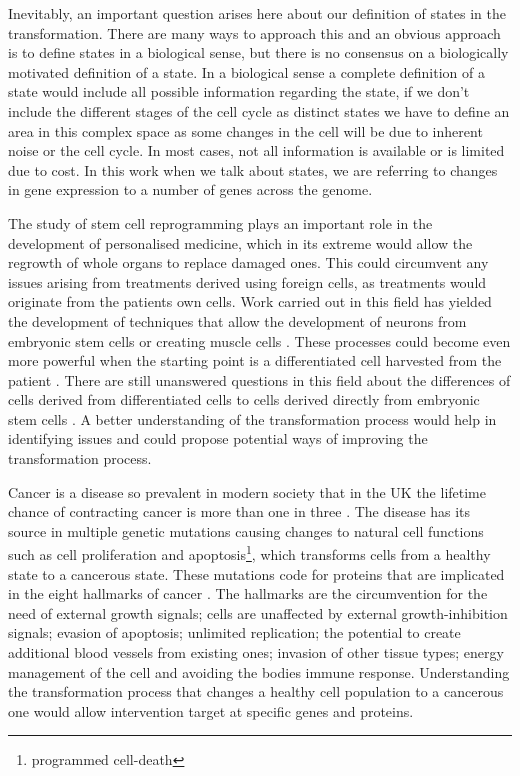 Inevitably, an important question arises here about our definition of states in the transformation. There are many ways to approach this and an obvious approach is to define states in a biological sense, but there is no consensus on a biologically motivated definition of a state. In a biological sense a complete definition of a state would include all possible information regarding the state, if we don't include the different stages of the cell cycle as distinct states we have to define an area in this complex space as some changes in the cell will be due to inherent noise or the cell cycle. In most cases, not all information is available or is limited due to cost. In this work when we talk about states, we are referring to changes in gene expression to a number of genes across the genome.

The study of stem cell reprogramming plays an important role in the development of personalised medicine, which in its extreme would allow the regrowth of whole organs to replace damaged ones. This could circumvent any issues arising from treatments derived using foreign cells, as treatments would originate from the patients own cells. Work carried out in this field has yielded the development of techniques that allow the development of neurons from embryonic stem cells \citep{Vierbuchen:2010fa, Pang:2011ce} or creating muscle cells \citep{Ieda:2010ir, Efe:2011bpa}. These processes could become even more powerful when the starting point is a differentiated cell harvested from the patient \citep{Takahashi:2006hi}. There are still unanswered questions in this field about the differences of cells derived from differentiated cells to cells derived directly from embryonic stem cells \citep{Carey:2011bs, Bock:2011kx}. A better understanding of the transformation process would help in identifying issues and could propose potential ways of improving the transformation process.

Cancer is a disease so prevalent in modern society that in the UK the lifetime chance of contracting cancer is more than one in three \citep{Sasieni:2011}. The disease has its source in multiple genetic mutations causing changes to natural cell functions such as cell proliferation and apoptosis\footnote{programmed cell-death}, which transforms cells from a healthy state to a cancerous state. These mutations code for proteins that are implicated in the eight hallmarks of cancer \citep{Hanahan:2011gu}. The hallmarks are the circumvention for the need of external growth signals; cells are unaffected by external growth-inhibition signals; evasion of apoptosis; unlimited replication; the potential to create additional blood vessels from existing ones; invasion of other tissue types; energy management of the cell and avoiding the bodies immune response. Understanding the transformation process that changes a healthy cell population to a cancerous one would allow intervention target at specific genes and proteins.

